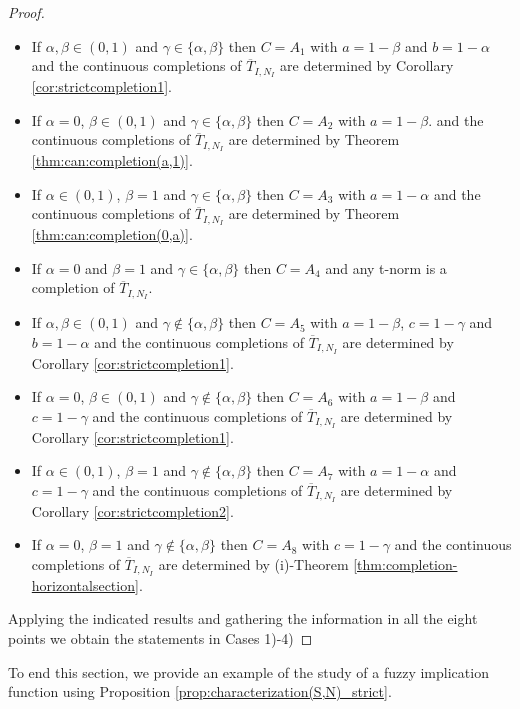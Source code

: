 \begin{proof}
\begin{itemize}
	\item If $\alpha, \beta \in (0,1)$ and $\gamma \in \{\alpha, \beta\}$ then  $C = A_1$ with $a=1-\beta$ and $b=1-\alpha$ and the continuous completions of $\overline{T}_{I,N_I}$ are determined by Corollary \ref{cor:strictcompletion1}.
	\item If $\alpha=0$, $\beta \in (0,1)$ and $\gamma \in \{\alpha, \beta\}$ then  $C = A_2$ with $a=1-\beta$. and the continuous completions of $\overline{T}_{I,N_I}$ are determined by Theorem \ref{thm:can:completion(a,1)}.
	\item If $\alpha \in (0,1)$, $\beta=1$ and $\gamma \in \{\alpha, \beta\}$ then $C = A_3$ with $a=1-\alpha$ and the continuous completions of $\overline{T}_{I,N_I}$ are determined by Theorem \ref{thm:can:completion(0,a)}.
	\item If $\alpha=0$ and $\beta=1$ and $\gamma \in \{\alpha, \beta\}$ then $C=A_4$ and any t-norm is a completion of $\overline{T}_{I,N_I}$.
	\item If $\alpha, \beta \in (0,1)$ and $\gamma \not\in \{\alpha, \beta\}$ then $C = A_5$ with $a=1-\beta$, $c=1-\gamma$ and $b=1-\alpha$ and the continuous completions of $\overline{T}_{I,N_I}$ are determined by Corollary \ref{cor:strictcompletion1}.
		\item If $\alpha=0$, $\beta \in (0,1)$ and $\gamma \not \in \{\alpha, \beta\}$ then $C = A_6$ with $a=1-\beta$ and $c=1-\gamma$ and the continuous completions of $\overline{T}_{I,N_I}$ are determined by Corollary \ref{cor:strictcompletion1}.
	\item If $\alpha \in (0,1)$, $\beta=1$ and $\gamma \not \in \{\alpha, \beta\}$ then $C = A_7$ with $a=1-\alpha$ and $c=1-\gamma$ and the continuous completions of $\overline{T}_{I,N_I}$ are determined by Corollary \ref{cor:strictcompletion2}.
	\item If $\alpha=0$, $\beta=1$ and $\gamma \not \in \{\alpha, \beta\}$ then $C = A_8$ with $c=1-\gamma$ and the continuous completions of $\overline{T}_{I,N_I}$ are determined by (i)-Theorem \ref{thm:completion-horizontalsection}.
\end{itemize}
Applying the indicated results and gathering the information in all the eight points we obtain the statements in Cases 1)-4) 
\end{proof}

To end this section, we provide an example of the study of a fuzzy implication function using Proposition \ref{prop:characterization(S,N)_strict}.


